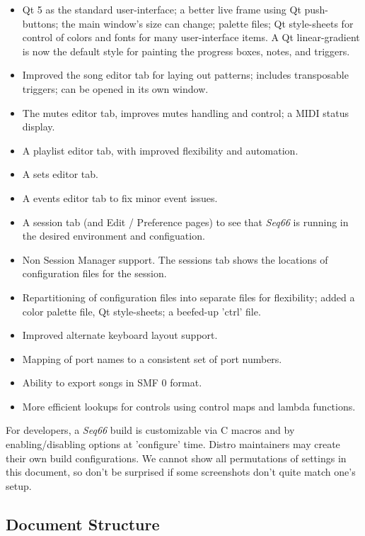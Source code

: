 \documentclass[
 11pt,
 twoside,
 a4paper,
 final                                 %
]{article}
\begin{document}
   \begin{itemize}
      \item Qt 5 as the standard user-interface;
         a better live frame using Qt push-buttons;
         the main window's size can change;
         palette files;
         Qt style-sheets for control of colors and fonts for many
         user-interface items.
         A Qt linear-gradient is now the default style for painting the
         progress boxes, notes, and triggers.
      \item Improved the song editor tab for laying out patterns;
         includes transposable triggers;
         can be opened in its own window.
      \item The mutes editor tab, improves mutes handling and control;
         a MIDI status display.
      \item A playlist editor tab, with improved flexibility and automation.
      \item A sets editor tab.
      \item A events editor tab to fix minor event issues.
      \item A session tab (and Edit / Preference pages) to see that
         \textsl{Seq66} is running in the desired environment and configuation.
      \item Non Session Manager support. The sessions tab shows the
         locations of configuration files for the session.
      \item Repartitioning of configuration files into separate files for
         flexibility; added a color palette file, Qt style-sheets; a beefed-up
         'ctrl' file.
      \item Improved alternate keyboard layout support.
      \item Mapping of port names to a consistent set of port numbers.
      \item Ability to export songs in SMF 0 format.
      \item More efficient lookups for controls using control maps
         and lambda functions.
   \end{itemize}

   For developers, a \textsl{Seq66} build is customizable via C macros and by
   enabling/disabling options at 'configure' time.
   Distro maintainers may create their own build configurations.
   We cannot show all permutations of settings in this document,
   so don't be surprised if some screenshots don't quite match one's setup.

\subsection{Document Structure}
\label{subsec:introduction_document_structure}
\end{document}
